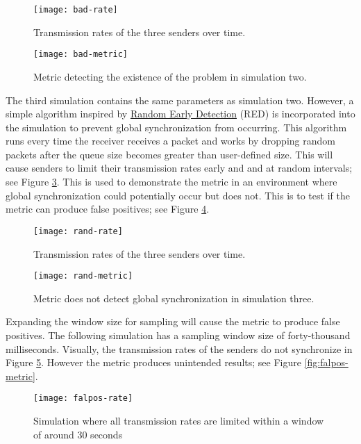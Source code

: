 \documentclass{article}
\begin{document}
\begin{figure}[H]
	\centering
	\texttt{[image: bad-rate]}
	\caption{Transmission rates of the three senders over time.}
	\label{fig:bad-rate}
\end{figure}

\begin{figure}[H]
	\centering
	\texttt{[image: bad-metric]}
	\caption{Metric detecting the existence of the problem in simulation two.}
	\label{fig:bad-metric}
\end{figure}	

The third simulation contains the same parameters as simulation two. However, a simple algorithm inspired by \href{https://en.wikipedia.org/wiki/Random_early_detection}{Random Early Detection} (RED) is incorporated into the simulation to prevent global synchronization from occurring. This algorithm runs every time the receiver receives a packet and works by dropping random packets after the queue size becomes greater than user-defined size. This will cause senders to limit their transmission rates early and and at random intervals; see Figure \ref{fig:rand-rate}. This is used to demonstrate the metric in an environment where global synchronization could potentially occur but does not. This is to test if the metric can produce false positives; see Figure \ref{fig:rand-metric}.

\begin{figure}[H]
	\centering
	\texttt{[image: rand-rate]}
	\caption{Transmission rates of the three senders over time.}
	\label{fig:rand-rate}
\end{figure}

\begin{figure}[H]
	\centering
	\texttt{[image: rand-metric]}
	\caption{Metric does not detect global synchronization in simulation three.}
	\label{fig:rand-metric}
\end{figure}

Expanding the window size for sampling will cause the metric to produce false positives. The following simulation has a sampling window size of forty-thousand milliseconds. Visually, the transmission rates of the senders do not synchronize in Figure \ref{fig:falpos-rate}. However the metric produces unintended results; see Figure \ref{fig:falpos-metric}.

\begin{figure}[H]
	\centering
	\texttt{[image: falpos-rate]}
	\caption{Simulation where all transmission rates are limited within a window of around 30 seconds}
	\label{fig:falpos-rate}
\end{figure}		
\end{document}
